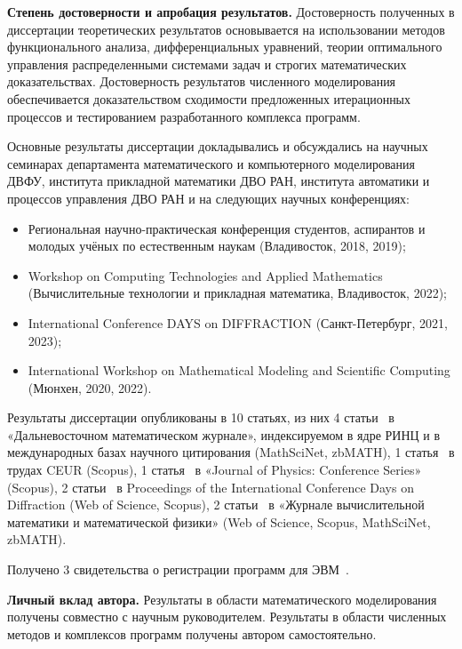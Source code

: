     \textbf{Степень достоверности и апробация результатов.}
    Достоверность полученных в диссертации теоретических результатов основывается на
    использовании методов функционального анализа, дифференциальных
    уравнений, теории оптимального управления распределенными системами
    задач и строгих математических доказательствах.
    Достоверность результатов численного моделирования обеспечивается
    доказательством сходимости предложенных итерационных процессов
    и тестированием разработанного комплекса программ.

    Основные результаты диссертации докладывались и обсуждались на
    научных семинарах департамента математического и компьютерного моделирования
    ДВФУ, института прикладной математики ДВО РАН, института автоматики
    и процессов управления ДВО РАН и на следующих научных конференциях:
    \begin{itemize}[leftmargin=5.5mm]
        \item Региональная научно-практическая конференция студентов, аспирантов
        и молодых учёных по естественным наукам (Владивосток, 2018, 2019);
        \item Workshop on Computing Technologies and Applied Mathematics
        (Вычислительные технологии и прикладная математика, Владивосток, 2022);
        \item International Conference DAYS on DIFFRACTION (Санкт-Петербург, 2021, 2023);
        \item International Workshop on Mathematical Modeling and Scientific Computing (Мюнхен, 2020, 2022).
    \end{itemize}

    {\publications}
    Результаты диссертации опубликованы в 10 статьях, из них 4
    статьи~\cite{mesenev_23_opt, mesenev_22_penalty, mesenev_20_alg, mesenev_18_boundary}
    в «Дальневосточном математическом журнале», индексируемом
    в ядре РИНЦ и в международных базах научного цитирования (MathSciNet,
    zbMATH), 1 статья~\cite{mesenev_20_opt_proc} в трудах CEUR (Scopus),
    1 статья~\cite{mesenev_23_math}
    в «Journal of Physics: Conference Series» (Scopus),
    2 статьи~\cite{mesenev_21_optimal_proc, mesenev_23_inv_proc}
    в Proceedings of the International Conference Days on Diffraction (Web of Science, Scopus),
    2 статьи~\cite{mesenev_23_problem, Mesenev_22_analysis}
    в «Журнале вычислительной математики и математической физики»
    (Web of Science, Scopus, MathSciNet, zbMATH).

    Получено 3 свидетельства о регистрации программ для ЭВМ~\cite{progbib1, progbib2, progbib3}.

    \textbf{Личный вклад автора.}
    Результаты в области математического моделирования получены совместно с научным руководителем.
    Результаты в области численных методов и комплексов программ получены автором самостоятельно.
